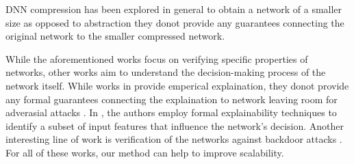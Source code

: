 DNN compression has been explored  in general to obtain a
network of a smaller size as opposed to abstraction they donot provide any guarantees
connecting the original network to the smaller compressed network. 

While the aforementioned works focus on verifying specific properties of 
networks, other works aim to understand the decision-making process of the network 
itself. While works in  provide
emperical explaination, they donot provide any formal guarantees connecting
the explaination to network leaving room for adverasial attacks . 
In , the authors employ formal
explainability techniques to identify a subset of input features that 
influence the network's decision. Another interesting line of work is verification
of the networks against backdoor attacks . 
For all of these works, our method can help to improve scalability. 
